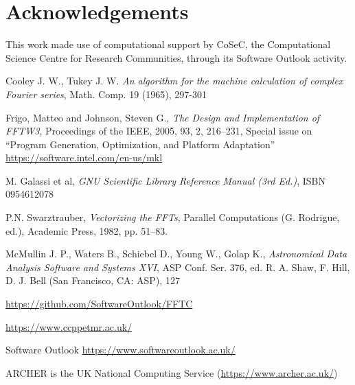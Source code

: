 \documentclass[12pt, a4paper]{article} \setlength{\textheight}{24cm}
\begin{document}
\section*{Acknowledgements}
This work made use of computational support by CoSeC, the
Computational Science Centre for Research Communities, through its
Software Outlook activity.



\begin{thebibliography}{9}

 Cooley J. W., Tukey J. W.  {\it An algorithm for the
    machine calculation of complex Fourier series}, Math. Comp. 19
  (1965), 297-301
 
 Frigo, Matteo and Johnson, Steven G., {\it The Design
    and Implementation of FFTW3}, Proceedings of the IEEE, 2005, 93,
  2, 216--231, Special issue on ``Program Generation, Optimization,
  and Platform Adaptation''
 \url{https://software.intel.com/en-us/mkl}

 M. Galassi et al, {\it GNU Scientific Library Reference
    Manual (3rd Ed.)}, ISBN 0954612078
  
 P.N. Swarztrauber, {\it Vectorizing the FFTs},
  Parallel Computations (G. Rodrigue, ed.), Academic Press, 1982, pp.
  51--83.
  
 McMullin J. P., Waters B., Schiebel D., Young W., Golap
  K., {\it Astronomical Data Analysis Software and Systems XVI}, ASP
  Conf. Ser. 376, ed. R. A. Shaw, F. Hill, D. J. Bell (San Francisco,
  CA: ASP), 127

 \url{https://github.com/SoftwareOutlook/FFTC}
    
 \url{https://www.ccppetmr.ac.uk/}

 Software Outlook
  \url{https://www.softwareoutlook.ac.uk/}

 ARCHER is the UK National Computing Service
  (\url{https://www.archer.ac.uk/})
  
\end{thebibliography}
\end{document}
